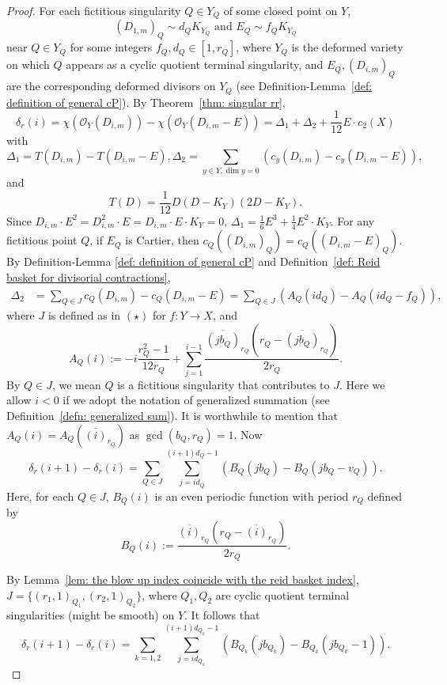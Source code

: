 \documentclass[11pt]{amsart}
\numberwithin{equation}{section}
\theoremstyle{definition}
\theoremstyle{definition}
\begin{document}
\begin{proof}
For each fictitious singularity $Q\in Y_Q$ of some closed point on $Y$, $$(D_{1,m})_Q\sim d_QK_{Y_Q} \text{  and  } E_Q\sim f_QK_{Y_Q}$$ near $Q\in Y_Q$ for some integers $f_Q, d_Q\in [1,r_Q]$, where $Y_Q$ is the deformed variety on which $Q$ appears as a cyclic quotient terminal singularity, and $E_Q, (D_{i,m})_Q$ are the corresponding deformed divisors on $Y_Q$ (see Definition-Lemma~\ref{def: definition of general cP}). By Theorem~\ref{thm: singular rr},
$$
\delta_r(i)=\chi(\mathcal{O}_Y(D_{i,m}))-\chi(\mathcal{O}_Y(D_{i,m}-E))=\Delta_1+\Delta_2+\frac{1}{12}E\cdot c_2(X)$$
with 
$$\Delta_1=T(D_{i,m})-T(D_{i,m}-E),\Delta_2=\sum_{y\in Y,\dim y=0}(c_y(D_{i,m})-c_y(D_{i,m}-E)),$$
and
$$T(D)=\frac{1}{12}D(D-K_Y)(2D-K_Y).$$
Since $D_{i,m}\cdot E^2=D_{i,m}^2\cdot E=D_{i,m}\cdot E\cdot K_Y=0$, $\Delta_1=\frac{1}{6}E^3+\frac{1}{4}E^2\cdot K_Y$. For any fictitious point $Q$, if $E_Q$ is Cartier, then $c_{Q}((D_{i,m})_{Q})=c_{Q}((D_{i,m}-E)_{Q})$. By Definition-Lemma \ref{def: definition of general cP} and Definition~\ref{def: Reid basket for divisorial contractions},
\begin{align*}
    \Delta_2&=\sum_{Q\in J} c_Q(D_{i,m})-c_Q(D_{i,m}-E)=\sum_{Q\in J}(A_Q(id_Q)-A_Q(id_Q-f_Q)),
\end{align*}
where $J$ is defined as in  $(\star)$ for $f:Y\to X$, and $$A_Q(i):=-i\frac{r^2_Q-1}{12r_Q}+\sum_{j=1}^{i-1}\frac{\overline{(jb_Q)}_{r_Q}(r_Q-\overline{(jb_Q)}_{r_Q})}{2r_Q}.$$ By $Q\in J$, we mean $Q$ is a fictitious singularity that contributes to $J$.
Here we allow $i<0$ if we adopt the notation of generalized summation (see Definition~\ref{defn: generalized sum}). It is worthwhile to mention that $A_Q(i)=A_Q(\overline{(i)}_{r_Q})$ as $\gcd(b_Q,r_Q)=1$.
Now
\begin{equation}\label{eqn: RR for delta}
   \delta_r(i+1)-\delta_r(i)=\sum_{Q\in J}\sum_{j=id_Q}^{(i+1)d_Q-1}(B_Q(jb_Q)-B_Q(jb_Q-v_Q)).
\end{equation}
Here, for each $Q\in J$, $B_{Q}(i)$ is an even periodic function with period $r_{Q}$ defined by $$B_{Q}(i):=\frac{\overline{(i)}_{r_Q}(r_Q-\overline{(i)}_{r_Q})}{2r_Q}.$$ 

By Lemma~\ref{lem: the blow up index coincide with the reid basket index}, $J=\{(r_1,1)_{Q_1},(r_2,1)_{Q_2}\}$, where $Q_1,Q_2$ are cyclic quotient terminal singularities (might be smooth) on $Y$. It follows that
\begin{equation}\label{eqn: subscription formula for delta function}
   \delta_r(i+1)-\delta_r(i)=\sum_{k=1,2}\sum_{j=id_{Q_k}}^{(i+1)d_{Q_k}-1}(B_{Q_k}(jb_{Q_k})-B_{Q_k}(jb_{Q_k}-1)).
\end{equation}


\end{proof}
\end{document}
